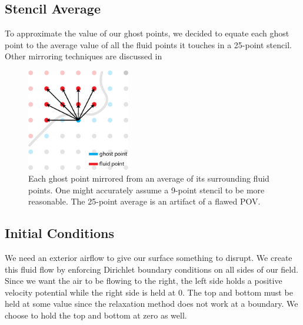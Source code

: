 \documentclass[11pt]{article}
\begin{document}
\subsection{Stencil Average}
To approximate the value of our ghost points, we decided to equate each ghost point to the average value of all the fluid points it touches in a 25-point stencil. Other mirroring techniques are discussed in \cite{lekven2017verification}

\begin{figure} [H] %
	\centering

	\includegraphics[width=0.4\textwidth]{lin_ghost_stencil.png}
	\caption{Each ghost point mirrored from an average of its surrounding fluid points. One might accurately assume a 9-point stencil to be more reasonable. The 25-point average is an artifact of a flawed POV.}
\end{figure}

\subsection{Initial Conditions}
We need an exterior airflow to give our surface something to disrupt. We create this fluid flow by enforcing Dirichlet boundary conditions on all sides of our field. Since we want the air to be flowing to the right, the left side holds a positive velocity potential while the right side is held at 0. The top and bottom must be held at some value since the relaxation method does not work at a boundary. We choose to hold the top and bottom at zero as well.
\end{document}

